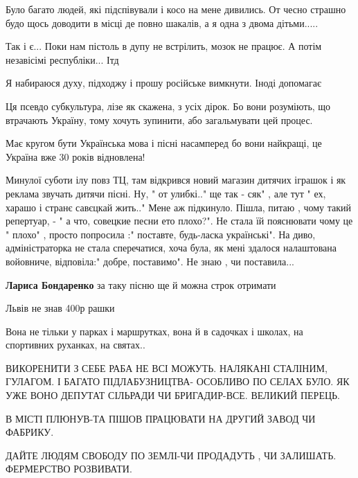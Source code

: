 \begin{itemize}
Було багато людей, які підспівували і косо на мене дивились. От чесно страшно
будо щось доводити в місці де повно шакалів, а я одна з двома дітьми.....

Так і є... Поки нам пістоль в дупу не встрілить, мозок не працює. А потім незавісімі республіки... Ітд

Я набираюся духу, підходжу і прошу російське вимкнути. Іноді допомагає


Ця псевдо субкультура, лізе як скажена, з усіх дірок.
Бо вони розуміють, що втрачають Україну, тому хочуть зупинити, або загальмувати цей процес.

Має кругом бути Українська мова і пісні насамперед бо вони найкращі, це Україна вже 30 років відновлена!


Минулої суботи ілу повз ТЦ, там відкрився новий магазин дитячих іграшок і як
реклама звучать дитячи пісні. Ну, " от улибкі.." ще так - сяк" , але тут " ех,
харашо і странє савєцкай жить.." Мене аж підкинуло. Пішла, питаю , чому такий
репертуар, - " а что, совецкие песни ето плохо?". Не стала їй пояснювати чому
це " плохо" , просто попросила :" поставте, будь-ласка українські". На диво,
адміністраторка не стала сперечатися, хоча була, як мені здалося налаштована
войовниче, відповіла:" добре, поставимо". Не знаю , чи поставила...

\begin{itemize} %
\textbf{Лариса Бондаренко} за таку пісню ще й можна строк отримати
\end{itemize} %

Львів не знав 400р рашки

Вона не тільки у парках і маршрутках, вона й в садочках і школах, на спортивних руханках, на святах..


ВИКОРЕНИТИ З СЕБЕ РАБА НЕ ВСІ МОЖУТЬ. НАЛЯКАНІ СТАЛІНИМ, ГУЛАГОМ. І БАГАТО
ПІДЛАБУЗНИЦТВА- ОСОБЛИВО ПО СЕЛАХ БУЛО. ЯК УЖЕ ВОНО ДЕПУТАТ СІЛЬРАДИ ЧИ
БРИГАДИР-ВСЕ. ВЕЛИКИЙ ПЕРЕЦЬ.

В МІСТІ ПЛЮНУВ-ТА ПІШОВ ПРАЦЮВАТИ НА ДРУГИЙ ЗАВОД ЧИ ФАБРИКУ.

ДАЙТЕ ЛЮДЯМ СВОБОДУ ПО ЗЕМЛІ-ЧИ ПРОДАДУТЬ , ЧИ ЗАЛИШАТЬ. ФЕРМЕРСТВО РОЗВИВАТИ.



\end{itemize}
